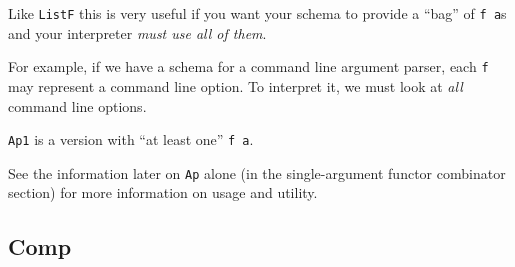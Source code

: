 \documentclass[]{article}
\begin{document}
\begin{itemize}
  Like \texttt{ListF} this is very useful if you want your schema to provide a
  ``bag'' of \texttt{f\ a}s and your interpreter \emph{must use all of them}.

  For example, if we have a schema for a command line argument parser, each
  \texttt{f} may represent a command line option. To interpret it, we must look
  at \emph{all} command line options.

  \texttt{Ap1} is a version with ``at least one'' \texttt{f\ a}.

  See the information later on \texttt{Ap} alone (in the single-argument functor
  combinator section) for more information on usage and utility.
\end{itemize}

\hypertarget{comp}{%
\subsection{Comp}\label{comp}}
\end{document}
